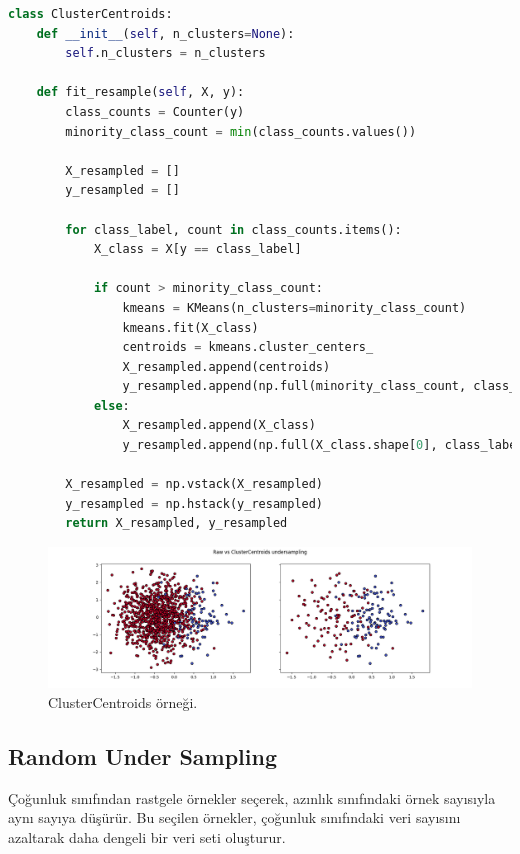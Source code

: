 \begin{lstlisting}[language=Python]
class ClusterCentroids:
    def __init__(self, n_clusters=None):
        self.n_clusters = n_clusters

    def fit_resample(self, X, y):
        class_counts = Counter(y)
        minority_class_count = min(class_counts.values())

        X_resampled = []
        y_resampled = []

        for class_label, count in class_counts.items():
            X_class = X[y == class_label]

            if count > minority_class_count:
                kmeans = KMeans(n_clusters=minority_class_count)
                kmeans.fit(X_class)
                centroids = kmeans.cluster_centers_
                X_resampled.append(centroids)
                y_resampled.append(np.full(minority_class_count, class_label))
            else:
                X_resampled.append(X_class)
                y_resampled.append(np.full(X_class.shape[0], class_label))

        X_resampled = np.vstack(X_resampled)
        y_resampled = np.hstack(y_resampled)
        return X_resampled, y_resampled
\end{lstlisting}

\begin{figure}[h]
    \centering
    \includegraphics[width=1\textwidth]{images/Raw vs ClusterCentroids undersampling.png}
    \caption{ClusterCentroids örneği.}
    \label{fig:enter-label}
\end{figure}

\newpage

\subsection{Random Under Sampling}
Çoğunluk sınıfından rastgele örnekler seçerek, azınlık sınıfındaki örnek sayısıyla aynı sayıya düşürür. Bu seçilen örnekler, çoğunluk sınıfındaki veri sayısını azaltarak daha dengeli bir veri seti oluşturur.

